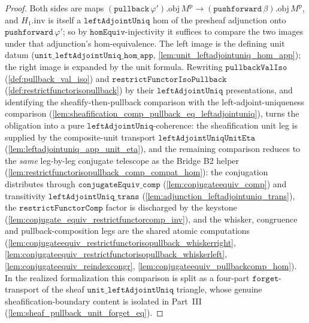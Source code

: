 \begin{proof}
  Both sides are maps \((\mathtt{pullback}\,\varphi').\mathrm{obj}\,M^{\mathrm p} \to
  (\mathtt{pushforward}\,\beta).\mathrm{obj}\,M^{\mathrm p}\), and \(H_1.\mathrm{inv}\) is itself a
  \(\mathtt{leftAdjointUniq}\) hom of the presheaf adjunction onto \(\mathtt{pushforward}\,\varphi'\);
  so by \(\mathtt{homEquiv}\)-injectivity it suffices to compare the two images under that adjunction's
  hom-equivalence. The left image is the defining unit datum
  (\(\mathtt{unit\_leftAdjointUniq\_hom\_app}\), \cref{lem:unit_leftadjointuniq_hom_app}); the right image
  is expanded by the unit formula. Rewriting \(\mathtt{pullbackValIso}\)
  (\cref{def:pullback_val_iso}) and \(\mathtt{restrictFunctorIsoPullback}\)
  (\cref{def:restrictfunctorisopullback}) by their \(\mathtt{leftAdjointUniq}\) presentations, and
  identifying the sheafify-then-pullback comparison with the left-adjoint-uniqueness comparison
  (\cref{lem:sheafification_comp_pullback_eq_leftadjointuniq}), turns the obligation into a pure
  \(\mathtt{leftAdjointUniq}\)-coherence: the sheafification unit leg is supplied by the composite-unit
  transport \(\mathtt{leftAdjointUniqUnitEta}\) (\cref{lem:leftadjointuniq_app_unit_eta}), and the
  remaining comparison reduces to the \emph{same} leg-by-leg conjugate telescope as the Bridge B2
  helper (\cref{lem:restrictfunctorisopullback_comp_compat_hom}): the conjugation distributes through
  \(\mathtt{conjugateEquiv\_comp}\) (\cref{lem:conjugateequiv_comp}) and transitivity
  \(\mathtt{leftAdjointUniq\_trans}\) (\cref{lem:adjunction_leftadjointuniq_trans}), the
  \(\mathtt{restrictFunctorComp}\) factor is discharged by the keystone
  (\cref{lem:conjugate_equiv_restrictfunctorcomp_inv}), and the whisker, congruence and
  pullback-composition legs are the shared atomic computations
  (\cref{lem:conjugateequiv_restrictfunctorisopullback_whiskerright},
  \cref{lem:conjugateequiv_restrictfunctorisopullback_whiskerleft},
  \cref{lem:conjugateequiv_reindexcongr}, \cref{lem:conjugateequiv_pullbackcomp_hom}).
  In the realized formalization this comparison is split as a four-part \(\mathtt{forget}\)-transport
  of the sheaf \(\mathtt{unit\_leftAdjointUniq}\) triangle, whose genuine sheafification-boundary
  content is isolated in Part~III (\cref{lem:sheaf_pullback_unit_forget_eq}).
\end{proof}

